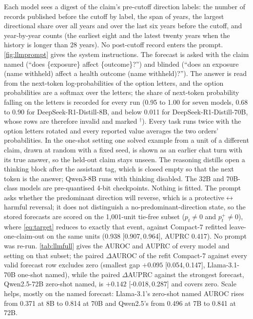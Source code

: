 \documentclass[11pt]{article}
\newcommand{\compact}{Compact-7\xspace}
\newcommand{\ci}[2]{[#1,\,#2]}
\begin{document}
Each model sees a digest of the claim's pre-cutoff direction labels: the number of records published
before the cutoff by label, the span of years, the largest directional share over all years and over
the last six years before the cutoff, and year-by-year counts (the earliest eight and the latest
twenty years when the history is longer than 28 years). No post-cutoff record enters the prompt.
\cref{fig:llmprompt} gives the system instructions. The forecast is asked with the claim named
(``does \{exposure\} affect \{outcome\}?'') and blinded (``does an exposure (name withheld) affect a
health outcome (name withheld)?''). The answer is read from the next-token log-probabilities of the
option letters, and the option probabilities are a softmax over the letters; the share of next-token
probability falling on the letters is recorded for every run (0.95 to 1.00 for seven models, 0.68
to 0.90 for DeepSeek-R1-Distill-8B, and below 0.011 for DeepSeek-R1-Distill-70B, whose rows are
therefore invalid and marked $^{\dagger}$). Every task runs twice with the option letters rotated
and every reported value averages the two orders' probabilities. In the one-shot setting one solved
example from a unit of a different claim, drawn at random with a fixed seed, is shown as an earlier
chat turn with its true answer, so the held-out claim stays unseen. The reasoning distills open a
thinking block after the assistant tag, which is closed empty so that the next token is the answer;
Qwen3-8B runs with thinking disabled. The 32B and 70B-class models are pre-quantised 4-bit
checkpoints. Nothing is fitted. The prompt asks whether the predominant direction will reverse, which is a
protective$\leftrightarrow$harmful reversal; it does not distinguish a no-predominant-direction
state, so the stored forecasts are scored on the 1{,}001-unit tie-free subset ($p_t\neq0$ and
$p^{+}_t\neq0$), where \cref{eq:target} reduces to exactly that event, against \compact
refitted leave-one-claim-out on the same units (0.938 \ci{0.907}{0.964}, AUPRC 0.417). No prompt
was re-run. \cref{tab:llmfull} gives the AUROC and AUPRC of every model and setting on that
subset; the paired $\Delta$AUROC of the refit \compact against every valid forecast row excludes
zero (smallest gap $+0.095$ \ci{0.054}{0.147}, Llama-3.1-70B one-shot named), while the paired
$\Delta$AUPRC against the strongest forecast, Qwen2.5-72B zero-shot named, is $+0.142$
\ci{-0.018}{0.287} and covers zero. Scale helps, mostly on the named forecast: Llama-3.1's
zero-shot named AUROC rises from 0.371 at 8B to 0.814 at 70B and Qwen2.5's from 0.496 at 7B to
0.841 at 72B.
\end{document}
